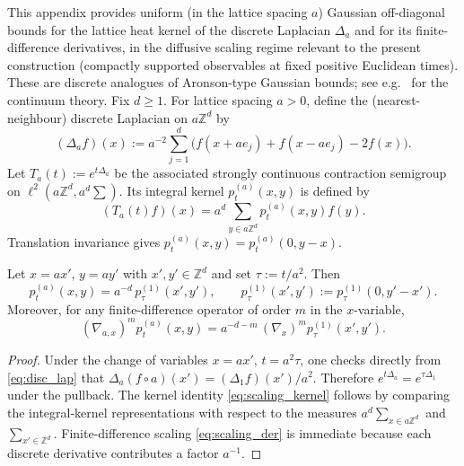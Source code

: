 \label{app:discrete_heat_kernel}

This appendix provides uniform (in the lattice spacing $a$) Gaussian off-diagonal bounds for the lattice heat kernel of the discrete Laplacian $\Delta_a$ and for its finite-difference derivatives, in the diffusive scaling regime relevant to the present construction (compactly supported observables at fixed positive Euclidean times). These are discrete analogues of Aronson-type Gaussian bounds; see e.g.\ \cite{Aronson1967,Davies1989} for the continuum theory.
Fix $d\ge 1$. For lattice spacing $a>0$, define the (nearest-neighbour) discrete Laplacian on $a\mathbb Z^d$ by
\begin{equation}\label{eq:disc_lap}
(\Delta_a f)(x):=a^{-2}\sum_{j=1}^d\Big(f(x+a e_j)+f(x-a e_j)-2f(x)\Big).
\end{equation}
Let $T_a(t):=e^{t\Delta_a}$ be the associated strongly continuous contraction semigroup on $\ell^2(a\mathbb Z^d,a^d\sum)$.
Its integral kernel $p_t^{(a)}(x,y)$ is defined by
\[
(T_a(t)f)(x)=a^d\sum_{y\in a\mathbb Z^d} p_t^{(a)}(x,y)f(y).
\]
Translation invariance gives $p_t^{(a)}(x,y)=p_t^{(a)}(0,y-x)$.

\begin{lemma}[Scaling reduction to $a=1$]\label{lem:scaling_a1}
Let $x=a x'$, $y=a y'$ with $x',y'\in\mathbb Z^d$ and set $\tau:=t/a^2$.
Then
\begin{equation}\label{eq:scaling_kernel}
p_t^{(a)}(x,y)=a^{-d}\,p_{\tau}^{(1)}(x',y'),
\qquad
p_{\tau}^{(1)}(x',y'):=p_{\tau}^{(1)}(0,y'-x').
\end{equation}
Moreover, for any finite-difference operator of order $m$ in the $x$-variable,
\begin{equation}\label{eq:scaling_der}
(\nabla_{a,x})^m p_t^{(a)}(x,y)=a^{-d-m}\,(\nabla_x)^m p_{\tau}^{(1)}(x',y').
\end{equation}
\end{lemma}

\begin{proof}
Under the change of variables $x=a x'$, $t=a^2\tau$, one checks directly from \eqref{eq:disc_lap} that
$\Delta_a(f\circ a)(x')=(\Delta_1 f)(x')/a^2$.
Therefore $e^{t\Delta_a}=e^{\tau\Delta_1}$ under the pullback.
The kernel identity \eqref{eq:scaling_kernel} follows by comparing the integral-kernel representations with respect to the measures
$a^d\sum_{x\in a\mathbb Z^d}$ and $\sum_{x'\in\mathbb Z^d}$.
Finite-difference scaling \eqref{eq:scaling_der} is immediate because each discrete derivative contributes a factor $a^{-1}$.
\end{proof}

